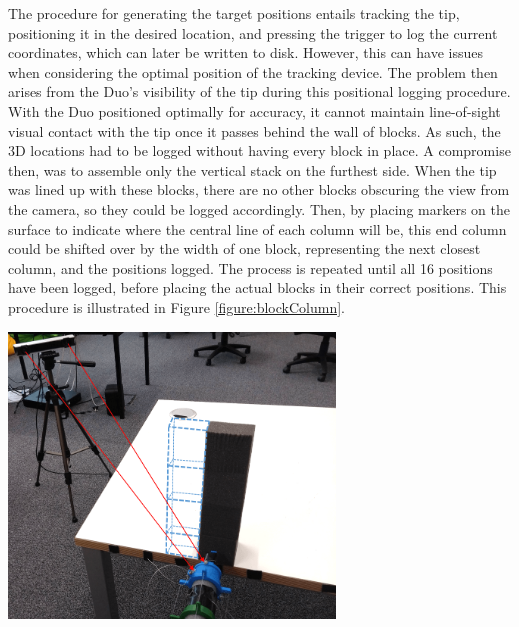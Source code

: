 \documentclass[11pt]{article}
\begin{document}
The procedure for generating the target positions entails tracking the tip, positioning it in the desired location, and pressing the trigger to log the current coordinates, which can later be written to disk. However, this can have issues when considering the optimal position of the tracking device. The problem then arises from the Duo's visibility of the tip during this positional logging procedure. With the Duo positioned optimally for accuracy, it cannot maintain line-of-sight visual contact with the tip once it passes behind the wall of blocks. As such, the 3D locations had to be logged without having every block in place. A compromise then, was to assemble only the vertical stack on the furthest side. When the tip was lined up with these blocks, there are no other blocks obscuring the view from the camera, so they could be logged accordingly. Then, by placing markers on the surface to indicate where the central line of each column will be, this end column could be shifted over by the width of one block, representing the next closest column, and the positions logged. The process is repeated until all 16 positions have been logged, before placing the actual blocks in their correct positions. This procedure is illustrated in Figure \ref{figure:blockColumn}.

\begin{center}
\includegraphics[width=0.65\textwidth]{images/blockColumn.png}
\label{figure:blockColumn}
\end{center}
\end{document}
